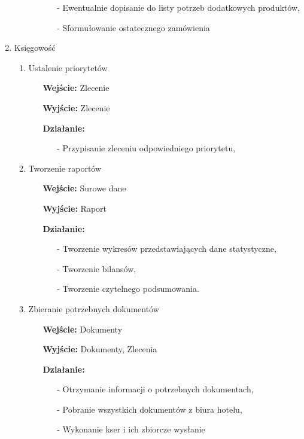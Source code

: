 \documentclass[a4paper, 11pt]{article}
\begin{document}
\begin{enumerate}[label*=\arabic*.]
\begin{enumerate}[label*=\arabic*.]
\begin{itemize}
\begin{itemize}
					\item[-] Ewentualnie dopisanie do listy potrzeb dodatkowych produktów,
					\item[-] Sformułowanie ostatecznego zamówienia
				\end{itemize}
			\end{itemize}
		\end{enumerate}	
		\item Księgowość
		\begin{enumerate}[label*=\arabic*.]
			\item Ustalenie priorytetów
			\begin{itemize}
				\item [\textbf{Wejście:}] Zlecenie
				\item [\textbf{Wyjście:}] Zlecenie
				\item [\textbf{Działanie:}] 
				\begin{itemize}
					\item[-] Przypisanie zleceniu odpowiedniego priorytetu,
				\end{itemize}
			\end{itemize}
			\item Tworzenie raportów
			\begin{itemize}
				\item [\textbf{Wejście:}] Surowe dane
				\item [\textbf{Wyjście:}] Raport
				\item [\textbf{Działanie:}] 
				\begin{itemize}
					\item[-] Tworzenie wykresów przedstawiających dane statystyczne,
					\item[-] Tworzenie bilansów,
					\item[-] Tworzenie czytelnego podsumowania.
				\end{itemize}
			\end{itemize}
			\item Zbieranie potrzebnych dokumentów			
			\begin{itemize}
				\item [\textbf{Wejście:}] Dokumenty
				\item [\textbf{Wyjście:}] Dokumenty, Zlecenia
				\item [\textbf{Działanie:}] 
				\begin{itemize}
					\item[-] Otrzymanie informacji o potrzebnych dokumentach,
					\item[-] Pobranie wszystkich dokumentów z biura hotelu,
					\item[-] Wykonanie kser i ich zbiorcze wysłanie
				\end{itemize}
			\end{itemize}
		\end{enumerate}	
	\end{enumerate}
	
\end{document}
